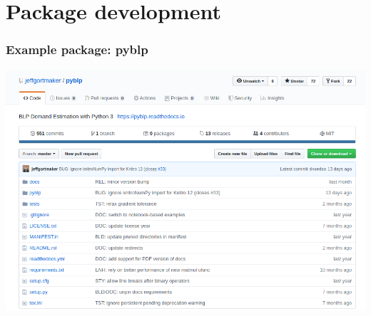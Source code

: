 \documentclass[10pt]{beamer}
\begin{document}
\section{Package development}

  \begin{frame} \frametitle{Example package: pyblp}

    \begin{center}
      \includegraphics[width=\textwidth]{pyblp_gh_snapshot.png}
    \end{center}

  \end{frame}
\end{document}
